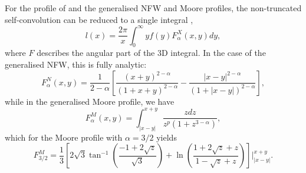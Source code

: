 \documentclass[5p]{elsarticle}
\begin{document}
For the profile of \citet{Moore1998} and the generalised NFW and Moore profiles, the non-truncated self-convolution can be reduced to a single integral \citep{Ma2000},
\begin{equation}
    l(x) = \frac{2\pi}{x}\int_0^\infty yf(y) F^X_\alpha(x,y) dy,
\end{equation}
where $F$ describes the angular part of the 3D integral. In the case of the generalised NFW, this is fully analytic:
\begin{equation}
    F^N_\alpha(x,y) = \frac{1}{2-\alpha}\left[ \frac{(x+y)^{2-\alpha}}{(1+x+y)^{2-\alpha}} - \frac{|x-y|^{2-\alpha}}{(1+|x-y|)^{2-\alpha}}\right],
\end{equation}
while in the generalised Moore profile, we have
\begin{equation}
    F^M_\alpha(x,y) = \int_{|x-y|}^{x+y} \frac{zdz}{z^p(1+z^{3-\alpha})},
\end{equation}
which for the Moore profile with $\alpha=3/2$ yields
\begin{equation}
    F^M_{3/2} = \frac{1}{3}\left[ 2\sqrt{3} \tan^{-1}\left(\frac{-1+2\sqrt{z}}{\sqrt{3}}\right) + \ln\left(\frac{1+2\sqrt{z} + z}{1-\sqrt{z}+z}\right)\right]\Bigg|_{|x-y|}^{x+y}.
\end{equation}



\end{document}
